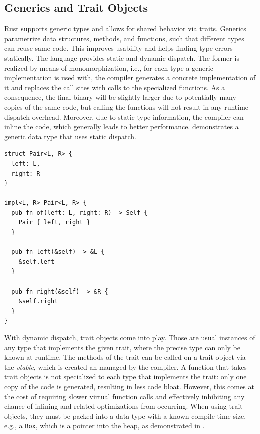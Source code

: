\documentclass[paper=a4,%
  twoside,%
  BCOR4mm,%
  abstract=true,%
  toc=bibliography,%
  chapterprefix=true,%
  toc=bibliographynumbered,%
  open=right,%
  english,%
  pagesize=pdftex]{scrreprt}
\begin{document}
\subsection{Generics and Trait Objects}
Rust supports generic types and allows for shared behavior via traits. Generics parametrize data structures, methods, and functions, such that different types can reuse same code. This improves usability and helps finding type errors statically. The language provides static and dynamic dispatch. The former is realized by means of monomorphization, i.e., for each type a generic implementation is used with, the compiler generates a concrete implementation of it and replaces the call sites with calls to the specialized functions. As a consequence, the final binary will be slightly larger due to potentially many copies of the same code, but calling the functions will not result in any runtime dispatch overhead. Moreover, due to static type information, the compiler can inline the code, which generally leads to better performance.  demonstrates a generic data type that uses static dispatch.

\begin{lstlisting}[style=boxed, caption={A data type with static dispatch via monomorphization}, label=lst:static-dispatch]
struct Pair<L, R> {
  left: L,
  right: R
}

impl<L, R> Pair<L, R> {
  pub fn of(left: L, right: R) -> Self {
    Pair { left, right }
  }

  pub fn left(&self) -> &L {
    &self.left
  }

  pub fn right(&self) -> &R {
    &self.right
  }
}
\end{lstlisting}

With dynamic dispatch, trait objects come into play. Those are usual instances of any type that implements the given trait, where the precise type can only be known at runtime. The methods of the trait can be called on a trait object via the \emph{vtable}, which is created an managed by the compiler. A function that takes trait objects is not specialized to each type that implements the trait: only one copy of the code is generated, resulting in less code bloat. However, this comes at the cost of requiring slower virtual function calls and effectively inhibiting any chance of inlining and related optimizations from occurring. When using trait objects, they must be packed into a data type with a known compile-time size, e.g., a \texttt{Box}, which is a pointer into the heap, as demonstrated in .
\end{document}
